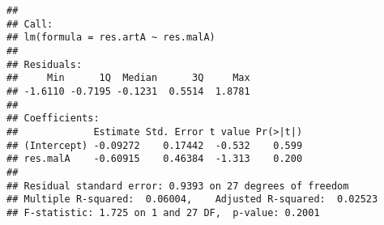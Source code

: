 \documentclass[]{article}
\newenvironment{Shaded}{\begin{snugshade}}{\end{snugshade}}
\newcommand{\KeywordTok}[1]{\textcolor[rgb]{0.13,0.29,0.53}{\textbf{#1}}}
\newcommand{\DataTypeTok}[1]{\textcolor[rgb]{0.13,0.29,0.53}{#1}}
\newcommand{\DecValTok}[1]{\textcolor[rgb]{0.00,0.00,0.81}{#1}}
\newcommand{\StringTok}[1]{\textcolor[rgb]{0.31,0.60,0.02}{#1}}
\newcommand{\CommentTok}[1]{\textcolor[rgb]{0.56,0.35,0.01}{\textit{#1}}}
\newcommand{\OtherTok}[1]{\textcolor[rgb]{0.56,0.35,0.01}{#1}}
\newcommand{\OperatorTok}[1]{\textcolor[rgb]{0.81,0.36,0.00}{\textbf{#1}}}
\newcommand{\NormalTok}[1]{#1}
\begin{document}
\begin{verbatim}
## 
## Call:
## lm(formula = res.artA ~ res.malA)
## 
## Residuals:
##     Min      1Q  Median      3Q     Max 
## -1.6110 -0.7195 -0.1231  0.5514  1.8781 
## 
## Coefficients:
##             Estimate Std. Error t value Pr(>|t|)
## (Intercept) -0.09272    0.17442  -0.532    0.599
## res.malA    -0.60915    0.46384  -1.313    0.200
## 
## Residual standard error: 0.9393 on 27 degrees of freedom
## Multiple R-squared:  0.06004,    Adjusted R-squared:  0.02523 
## F-statistic: 1.725 on 1 and 27 DF,  p-value: 0.2001
\end{verbatim}

\begin{Shaded}
\end{Shaded}
\end{document}
